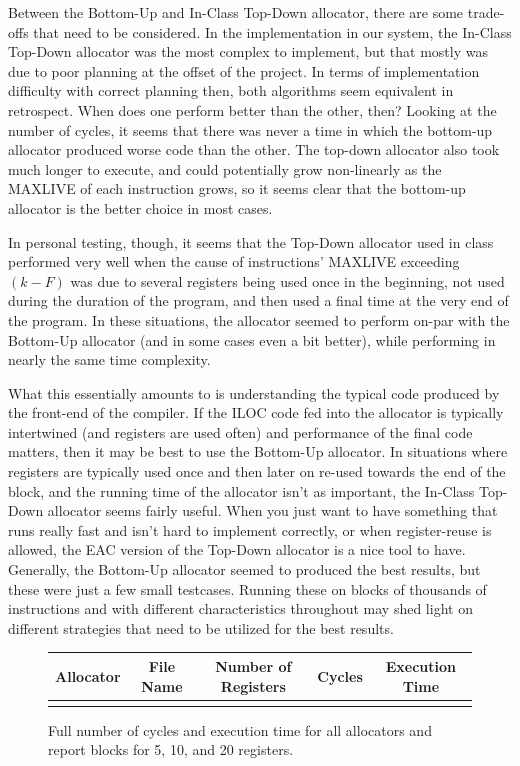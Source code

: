 \documentclass[answers]{exam}
\begin{document}
	Between the Bottom-Up and In-Class Top-Down allocator, there are some trade-offs that need to be considered. In the implementation in our system, the In-Class Top-Down allocator was the most complex to implement, but that mostly was due to poor planning at the offset of the project. In terms of implementation difficulty with correct planning then, both algorithms seem equivalent in retrospect. When does one perform better than the other, then? Looking at the number of cycles, it seems that there was never a time in which the bottom-up allocator produced worse code than the other. The top-down allocator also took much longer to execute, and could potentially grow non-linearly as the MAXLIVE of each instruction grows, so it seems clear that the bottom-up allocator is the better choice in most cases.
	
	In personal testing, though, it seems that the Top-Down allocator used in class performed very well when the cause of instructions' MAXLIVE exceeding $(k - F)$ was due to several registers being used once in the beginning, not used during the duration of the program, and then used a final time at the very end of the program. In these situations, the allocator seemed to perform on-par with the Bottom-Up allocator (and in some cases even a bit better), while performing in nearly the same time complexity.
	
	What this essentially amounts to is understanding the typical code produced by the front-end of the compiler. If the ILOC code fed into the allocator is typically intertwined (and registers are used often) and performance of the final code matters, then it may be best to use the Bottom-Up allocator. In situations where registers are typically used once and then later on re-used towards the end of the block, and the running time of the allocator isn't as important, the In-Class Top-Down allocator seems fairly useful. When you just want to have something that runs really fast and isn't hard to implement correctly, or when register-reuse is allowed, the EAC version of the Top-Down allocator is a nice tool to have. Generally, the Bottom-Up allocator seemed to produced the best results, but these were just a few small testcases. Running these on blocks of thousands of instructions and with different characteristics throughout may shed light on different strategies that need to be utilized for the best results. 

\pagebreak

\begin{figure}[H]
			\centering
			\begin{tabular}{c|c|c|c|c}%
				 \bfseries Allocator & \bfseries File Name & \bfseries Number of Registers & \bfseries Cycles & \bfseries Execution Time
				\csvreader[head to column names]{all_cycles.csv}{}%
				{\\\hline \allocator & \file & \registers & \cycles & \time}
			\end{tabular}
			\caption{Full number of cycles and execution time for all allocators and report blocks for 5, 10, and 20 registers.}
		\end{figure}
\end{document}
